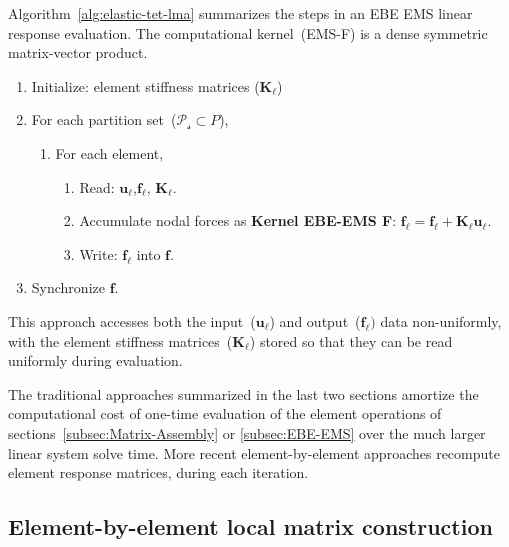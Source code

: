 \documentclass[]             %
{NASA}                       %
\begin{document}
Algorithm~\ref{alg:elastic-tet-lma} summarizes the steps in an EBE EMS linear response evaluation.
 The computational kernel~(EMS\nobreakdash-F) is a dense symmetric matrix-vector product.
\begin{algorithm}[ht]%
\caption{Linear response EBE EMS physics evaluation}
\label{alg:elastic-tet-lma}
\begin{enumerate}
\item Initialize:
element stiffness matrices ($\mathbf{K}_{\ell}$)
\item For each partition set~($\mathcal{P_{s}} \subset P$),
\begin{enumerate}
\item For each element,
\begin{enumerate}
\item Read: $\mathbf{u}_{\ell}$,$\mathbf{f}_{\ell}$, $\mathbf{K}_{\ell}$.
\item Accumulate nodal forces as
\newline
\textbf{Kernel EBE\nobreakdash-EMS F}: $\mathbf{f}_{\ell}=\mathbf{f}_{\ell}+\mathbf{K}_{\ell}\mathbf{u}_{\ell}$.
\item Write: $\mathbf{f}_{\ell}$ into $\mathbf{f}$.
\end{enumerate}
\end{enumerate}
\item Synchronize $\mathbf{f}$.
\end{enumerate}
\end{algorithm}
This approach accesses both the input~($\mathbf{u}_{\ell}$)
and output~($\mathbf{f}_{\ell})$ data non-uniformly,
with the element stiffness matrices~($\mathbf{K}_{\ell}$)
stored so that they can be read uniformly during evaluation.
 
The traditional approaches summarized in the last two sections amortize the computational
cost of one-time evaluation of the element operations of sections~\ref{subsec:Matrix-Assembly}
or \ref{subsec:EBE-EMS}
over the much larger linear system solve time.
 More recent element-by-element approaches recompute element response matrices, during
 each iteration.

\subsection{Element-by-element local matrix construction}
\label{subsec:EBE-LMC}
\end{document}
